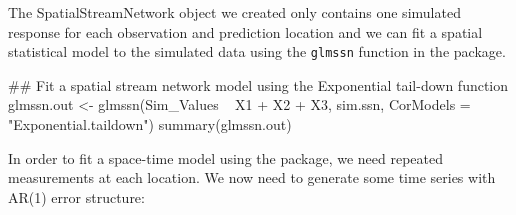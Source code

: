 The SpatialStreamNetwork object we created only contains one simulated response for each observation and prediction location and we can fit a spatial statistical model to the simulated data using the \texttt{glmssn} function in the  package. 

\begin{example}
## Fit a spatial stream network model using the Exponential tail-down function
glmssn.out <- glmssn(Sim_Values ~ X1 + X2 + X3, sim.ssn,
                     CorModels = "Exponential.taildown")
summary(glmssn.out)
\end{example}

In order to fit a space-time model using the  package, we need repeated measurements at each location. We now need to generate some time series with AR(1) error structure:

